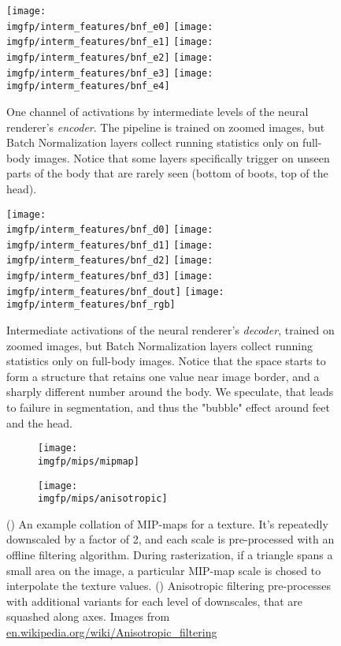 \begin{figure}
	\centering
	\texttt{[image: \\imgfp/interm\_features/bnf\_e0]}%
	\hfill\texttt{[image: \\imgfp/interm\_features/bnf\_e1]}%
	\hfill\texttt{[image: \\imgfp/interm\_features/bnf\_e2]}%
	\hfill\texttt{[image: \\imgfp/interm\_features/bnf\_e3]}%
	\hfill\texttt{[image: \\imgfp/interm\_features/bnf\_e4]}%
	\caption{One channel of activations by intermediate levels of the neural renderer's \textit{encoder}. The pipeline is trained on zoomed images, but Batch Normalization layers collect running statistics only on full-body images. Notice that some layers specifically trigger on unseen parts of the body that are rarely seen (bottom of boots, top of the head).}
	\label{fig:interm06_encoder}
\end{figure}
\begin{figure}
	\centering
	\texttt{[image: \\imgfp/interm\_features/bnf\_d0]}%
	\hfill\texttt{[image: \\imgfp/interm\_features/bnf\_d1]}%
	\hfill\texttt{[image: \\imgfp/interm\_features/bnf\_d2]}%
	\hfill\texttt{[image: \\imgfp/interm\_features/bnf\_d3]}%
	\hfill\texttt{[image: \\imgfp/interm\_features/bnf\_dout]}%
	\hfill\texttt{[image: \\imgfp/interm\_features/bnf\_rgb]}%
	\caption{Intermediate activations of the neural renderer's \textit{decoder}, trained on zoomed images, but Batch Normalization layers collect running statistics only on full-body images. Notice that the space starts to form a structure that retains one value near image border, and a sharply different number around the body. We speculate, that leads to failure in segmentation, and thus the "bubble" effect around feet and the head. }
	\label{fig:interm06_decoder}
\end{figure}
\begin{figure}
	\centering
	\begin{subfigure}[b]{0.48\textwidth}
		\centering
		\texttt{[image: \\imgfp/mips/mipmap]}%
		\caption{}
		\label{fig:mipmap}
	\end{subfigure}
	\hfill
	\begin{subfigure}[b]{0.48\textwidth}
		\centering
		\texttt{[image: \\imgfp/mips/anisotropic]}
		\caption{}
		\label{fig:anisotropic}
	\end{subfigure}
	\caption{(\protect{}) An example collation of MIP-maps for a texture. It's repeatedly downscaled by a factor of 2, and each scale is pre-processed with an offline filtering algorithm. During rasterization, if a triangle spans a small area on the image, a particular MIP-map scale is chosed to interpolate the texture values. (\protect{}) Anisotropic filtering pre-processes with additional variants for each level of downscales, that are squashed along axes. Images from \href{https://en.wikipedia.org/wiki/Anisotropic_filtering}{en.wikipedia.org/wiki/Anisotropic\_filtering}} 
\end{figure}
